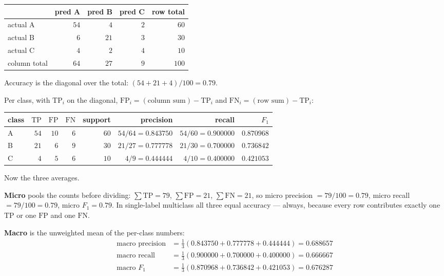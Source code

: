 \documentclass[11pt]{article}
\newcommand{\TP}{\mathrm{TP}}
\newcommand{\FP}{\mathrm{FP}}
\newcommand{\FN}{\mathrm{FN}}
\begin{document}
\begin{worked}
\begin{center}\small
\begin{tabular}{@{}lrrrr@{}}
\toprule
 & pred A & pred B & pred C & row total\\
\midrule
actual A & $54$ & $4$ & $2$ & $60$\\
actual B & $6$ & $21$ & $3$ & $30$\\
actual C & $4$ & $2$ & $4$ & $10$\\
\midrule
column total & $64$ & $27$ & $9$ & $100$\\
\bottomrule
\end{tabular}
\end{center}

Accuracy is the diagonal over the total: $(54 + 21 + 4)/100 = 0.79$.

Per class, with $\TP_i$ on the diagonal, $\FP_i = (\text{column sum}) - \TP_i$
and $\FN_i = (\text{row sum}) - \TP_i$:
\begin{center}\small
\begin{tabular}{@{}lrrrrrrr@{}}
\toprule
class & $\TP$ & $\FP$ & $\FN$ & support & precision & recall & $F_1$\\
\midrule
A & $54$ & $10$ & $6$ & $60$ & $54/64 = 0.843750$ & $54/60 = 0.900000$ & $0.870968$\\
B & $21$ & $6$  & $9$ & $30$ & $21/27 = 0.777778$ & $21/30 = 0.700000$ & $0.736842$\\
C & $4$  & $5$  & $6$ & $10$ & $4/9  = 0.444444$ & $4/10 = 0.400000$ & $0.421053$\\
\bottomrule
\end{tabular}
\end{center}

Now the three averages.

\textbf{Micro} pools the counts before dividing:
$\sum \TP = 79$, $\sum \FP = 21$, $\sum \FN = 21$, so micro precision
$= 79/100 = 0.79$, micro recall $= 79/100 = 0.79$, micro $F_1 = 0.79$. In
single-label multiclass all three equal accuracy --- always, because every row
contributes exactly one $\TP$ or one $\FP$ and one $\FN$.

\textbf{Macro} is the unweighted mean of the per-class numbers:
\begin{align*}
\text{macro precision} &= \tfrac{1}{3}(0.843750 + 0.777778 + 0.444444) = 0.688657\\
\text{macro recall}    &= \tfrac{1}{3}(0.900000 + 0.700000 + 0.400000) = 0.666667\\
\text{macro } F_1      &= \tfrac{1}{3}(0.870968 + 0.736842 + 0.421053) = 0.676287
\end{align*}


\end{worked}
\end{document}
